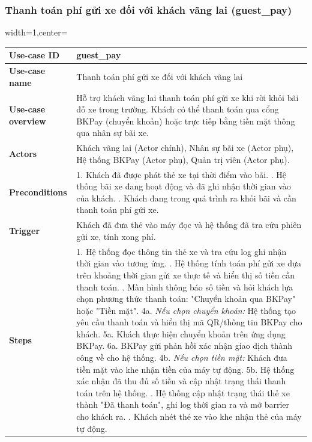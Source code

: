 \subsubsection{Thanh toán phí gửi xe đối với khách vãng lai (guest\_pay)}
\begin{adjustbox}{width=1\textwidth,center=\textwidth}
\small
\begin{tabular}{|>{\centering\arraybackslash}m{3.5cm}|m{13.2cm}|}
\hline
\textbf{Use-case ID} & guest\_pay \\ \hline
\textbf{Use-case name} & Thanh toán phí gửi xe đối với khách vãng lai \\ \hline
\textbf{Use-case overview} & Hỗ trợ khách vãng lai thanh toán phí gửi xe khi rời khỏi bãi đỗ xe trong trường. Khách có thể thanh toán qua cổng BKPay (chuyển khoản) hoặc trực tiếp bằng tiền mặt thông qua nhân sự bãi xe. \\ \hline
\textbf{Actors} & Khách vãng lai (Actor chính), Nhân sự bãi xe (Actor phụ), Hệ thống BKPay (Actor phụ), Quản trị viên (Actor phụ). \\ \hline
\textbf{Preconditions} &
1. Khách đã được phát thẻ xe tại thời điểm vào bãi. \newline
2. Hệ thống bãi xe đang hoạt động và đã ghi nhận thời gian vào của khách. \newline
3. Khách đang trong quá trình ra khỏi bãi và cần thanh toán phí gửi xe. \\ \hline
\textbf{Trigger} & Khách đã đưa thẻ vào máy đọc và hệ thống đã tra cứu phiên gửi xe, tính xong phí. \\ \hline
\textbf{Steps} &
1. Hệ thống đọc thông tin thẻ xe và tra cứu log ghi nhận thời gian vào tương ứng. \newline
2. Hệ thống tính toán phí gửi xe dựa trên khoảng thời gian gửi xe thực tế và hiển thị số tiền cần thanh toán. \newline
3. Màn hình thông báo số tiền và hỏi khách lựa chọn phương thức thanh toán: "Chuyển khoản qua BKPay" hoặc "Tiền mặt". \newline
4a. \textit{Nếu chọn chuyển khoản:} Hệ thống tạo yêu cầu thanh toán và hiển thị mã QR/thông tin BKPay cho khách. \newline
5a. Khách thực hiện chuyển khoản trên ứng dụng BKPay. \newline
6a. BKPay gửi phản hồi xác nhận giao dịch thành công về cho hệ thống. \newline
4b. \textit{Nếu chọn tiền mặt:} Khách đưa tiền mặt vào khe nhận tiền của máy tự động. \newline
5b. Hệ thống xác nhận đã thu đủ số tiền và cập nhật trạng thái thanh toán trên hệ thống. \newline
7. Hệ thống cập nhật trạng thái thẻ xe thành "Đã thanh toán", ghi log thời gian ra và mở barrier cho khách ra. \newline
8. Khách nhét thẻ xe vào khe nhận thẻ của máy tự động. \\ \hline
\end{tabular}
\end{adjustbox}

